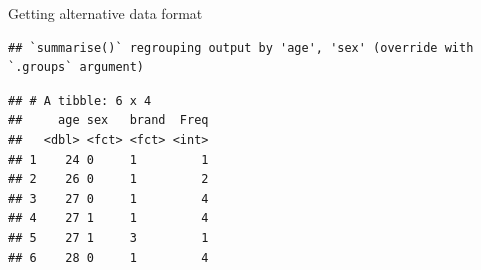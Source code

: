 \documentclass[
  ignorenonframetext,
]{beamer}
\newenvironment{Shaded}{\begin{snugshade}}{\end{snugshade}}
\newcommand{\DataTypeTok}[1]{\textcolor[rgb]{0.13,0.29,0.53}{#1}}
\newcommand{\DecValTok}[1]{\textcolor[rgb]{0.00,0.00,0.81}{#1}}
\newcommand{\KeywordTok}[1]{\textcolor[rgb]{0.13,0.29,0.53}{\textbf{#1}}}
\newcommand{\NormalTok}[1]{#1}
\newcommand{\OperatorTok}[1]{\textcolor[rgb]{0.81,0.36,0.00}{\textbf{#1}}}
\newcommand{\StringTok}[1]{\textcolor[rgb]{0.31,0.60,0.02}{#1}}
\begin{document}
\begin{frame}[fragile]{Getting alternative data format}
\protect\hypertarget{getting-alternative-data-format}{}

\begin{Shaded}
\end{Shaded}

\begin{verbatim}
## `summarise()` regrouping output by 'age', 'sex' (override with `.groups` argument)
\end{verbatim}

\begin{Shaded}
\end{Shaded}

\begin{verbatim}
## # A tibble: 6 x 4
##     age sex   brand  Freq
##   <dbl> <fct> <fct> <int>
## 1    24 0     1         1
## 2    26 0     1         2
## 3    27 0     1         4
## 4    27 1     1         4
## 5    27 1     3         1
## 6    28 0     1         4
\end{verbatim}

\end{frame}
\end{document}
